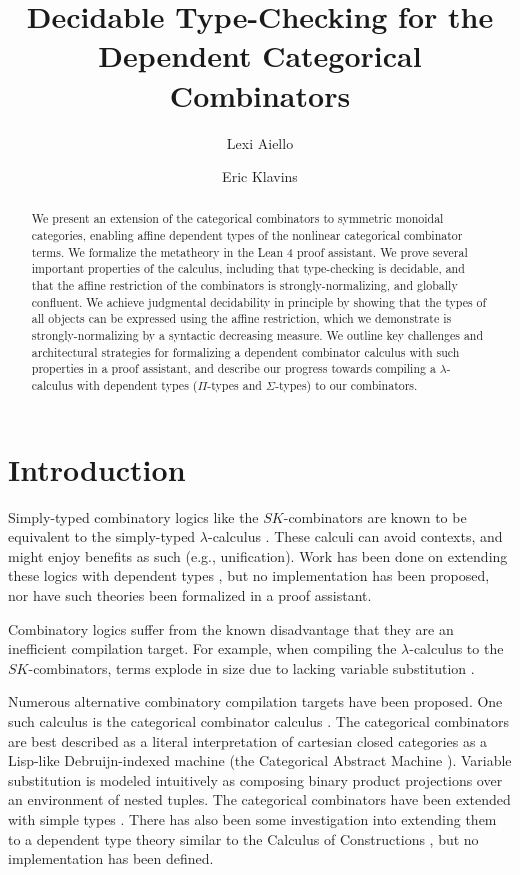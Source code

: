 \documentclass{article}
\title{Decidable Type-Checking for the Dependent Categorical Combinators}
\author[1]{Lexi Aiello}
\author[2]{Eric Klavins}
\affil[1]{Department of Philosophy, University of Washington}
\affil[2]{Electrical \& Computer Engineering Department, University of Washington}
\begin{document}
\maketitle
\begin{abstract}
  We present an extension of the categorical combinators \autocite{CURIEN1986188} to symmetric monoidal categories, enabling affine dependent types of the nonlinear categorical combinator terms. We formalize the metatheory in the Lean 4 proof assistant. We prove several important properties of the calculus, including that type-checking is decidable, and that the affine restriction of the combinators is strongly-normalizing, and globally confluent. We achieve judgmental decidability in principle by showing that the types of all objects can be expressed using the affine restriction, which we demonstrate is strongly-normalizing by a syntactic decreasing measure. We outline key challenges and architectural strategies for formalizing a dependent combinator calculus with such properties in a proof assistant, and describe our progress towards compiling a \(\lambda\)-calculus with dependent types (\(\Pi\)-types and \(\Sigma\)-types) to our combinators.

\end{abstract}
\section{Introduction}

Simply-typed combinatory logics like the \(SK\)-combinators are known to be equivalent to the simply-typed \(\lambda\)-calculus \autocite{Altenkirch2023CombinatoryLA}. These calculi can avoid contexts, and might enjoy benefits as such (e.g., unification). Work has been done on extending these logics with dependent types \autocite{altenkirch}, but no implementation has been proposed, nor have such theories been formalized in a proof assistant.

Combinatory logics suffer from the known disadvantage that they are an inefficient compilation target. For example, when compiling the \(\lambda\)-calculus to the \(SK\)-combinators, terms explode in size due to lacking variable substitution \autocite[p. 267]{10.5555/1096899}.

Numerous alternative combinatory compilation targets have been proposed. One such calculus is the categorical combinator calculus \autocite{CURIEN1986188}. The categorical combinators are best described as a literal interpretation of cartesian closed categories as a Lisp-like Debruijn-indexed machine (the Categorical Abstract Machine \autocite{cmachine}). Variable substitution is modeled intuitively as composing binary product projections \autocite[p. 6]{cmachine} over an environment of nested tuples. The categorical combinators have been extended with simple types \autocite{CURIEN1986188}. There has also been some investigation into extending them to a dependent type theory similar to the Calculus of Constructions \autocite{ritter1990categorical}, but no implementation has been defined.
\end{document}
